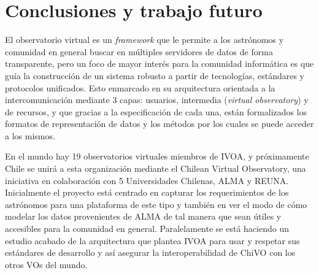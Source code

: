 \section{Conclusiones y trabajo futuro}

El observatorio virtual es un \textit{framework} que le permite a los astrónomos y
comunidad en general buscar en múltiples servidores de datos de forma
transparente, pero un foco de mayor interés para la comunidad informática es
que guía la construcción de un sistema robusto a partir de tecnologías,
estándares y protocolos unificados. Esto enmarcado en su arquitectura orientada
a la intercomunicación mediante 3 capas: usuarios, intermedia (\textit{virtual
observatory}) y de recursos, y que gracias a la especificación de cada una,
están formalizados los formatos de representación de datos y los métodos por
los cuales se puede acceder a los mismos.

En el mundo hay 19 observatorios virtuales miembros de IVOA, y próximamente
Chile se unirá a esta organización mediante el Chilean Virtual Observatory, una
iniciativa en colaboración con 5 Universidades Chilenas, ALMA y REUNA.
Inicialmente el proyecto está centrado en capturar los requerimientos de los
astrónomos para una plataforma de este tipo y también en ver el modo de cómo
modelar los datos provenientes de ALMA de tal manera que sean útiles y
accesibles para la comunidad en general. Paralelamente se está haciendo un
estudio acabado de la arquitectura que plantea IVOA para usar y respetar
sus estándares de desarrollo y así asegurar la interoperabilidad de ChiVO
con los otros VOs del mundo.
